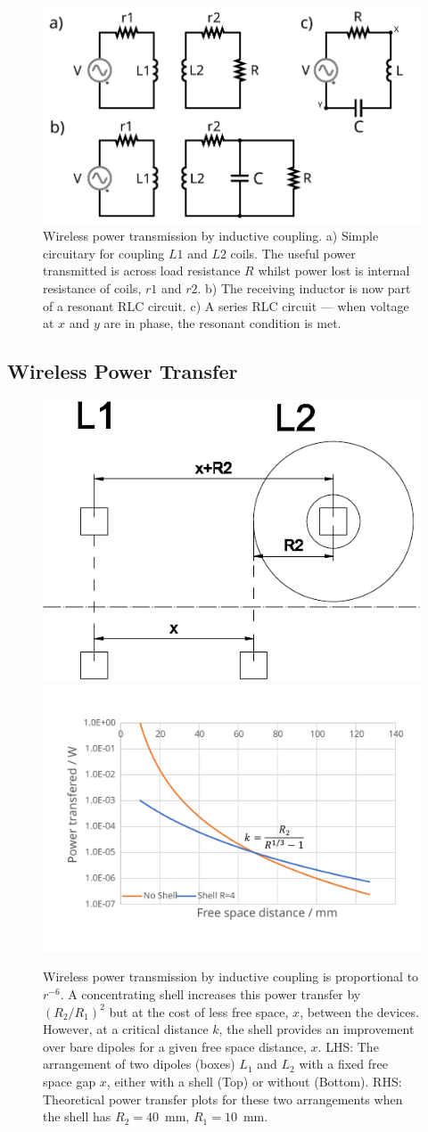 \documentclass[11pt]{iopart}
\begin{document}
\begin{figure}
  \begin{center}
   \noindent\includegraphics[width=0.5\linewidth]{images/WPT.pdf}
  \end{center}
  \caption{Wireless power transmission by inductive coupling. a)
    Simple circuitary for coupling $L1$ and $L2$ coils. The useful
    power transmitted is across load resistance $R$ whilst power lost
    is internal resistance of coils, $r1$ and $r2$. b) The receiving
    inductor is now part of a resonant RLC circuit. c) A series RLC
    circuit --- when voltage at $x$ and $y$ are in phase, the resonant
    condition is met.}\label{fig:WPT}
\end{figure}

\subsection{Wireless Power Transfer}

\begin{figure}
  \begin{center}
   \noindent\includegraphics[width=0.35\linewidth]{images/free_space.pdf}
   \noindent\includegraphics[width=0.45\linewidth]{images/dist_motiv.pdf}
  \end{center}
  \caption{Wireless power transmission by inductive coupling is
    proportional to $r^{-6}$. A concentrating shell increases this power
    transfer by $(R_2/R_1)^2$ but at the cost of less free space, $x$,
    between the devices. However, at a critical distance $k$, the
    shell provides an improvement over bare dipoles for a given free
    space distance, $x$. LHS: The arrangement of two dipoles (boxes)
    $L_1$ and $L_2$ with a fixed free space gap $x$, either with a
    shell (Top) or without (Bottom). RHS: Theoretical power transfer
    plots for these two arrangements when the shell has $R_2 = 40$~mm,
    $R_1 = 10$~mm.}\label{fig:d_motiv}
\end{figure}
\end{document}

